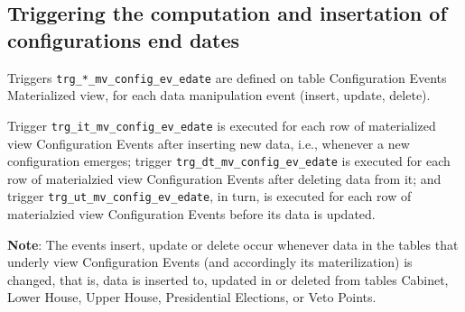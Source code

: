 \subsection{Triggering the computation and insertation of configurations end dates}\label{subsec_trg_mv_config_ev_edate}

Triggers \texttt{trg\_*\_mv\_config\_ev\_edate} are defined on table Configuration Events Materialized view, for each data manipulation event (insert, update, delete).

Trigger \texttt{trg\_it\_mv\_config\_ev\_edate} is executed for each row of materialized view Configuration Events after inserting new data, i.e., whenever a new configuration emerges; 
trigger \texttt{trg\_dt\_mv\_config\_ev\_edate} is executed for each row of materialzied view Configuration Events after deleting data from it; and 
trigger \texttt{trg\_ut\_mv\_config\_ev\_edate}, in turn, is executed for each row of materialzied view Configuration Events before its data is updated.  

{\bf Note}: The events insert, update or delete occur whenever data in the tables that underly view Configuration Events (and accordingly its materilization) is changed, that is, data is inserted to, updated in or deleted from tables Cabinet, Lower House, Upper House, Presidential Elections, or Veto Points.